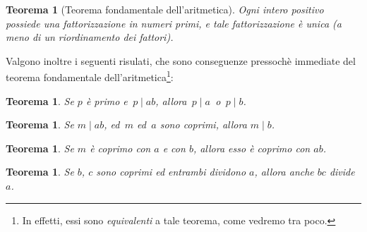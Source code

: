 \documentclass[pdflatex,11pt,a4paper,oneside]{article}
\newcommand{\TFA}{teorema fondamentale dell'aritmetica}
\let\OldEmph\emph
\renewcommand{\emph}[1]{\OldEmph{#1\/}}
\newcommand{\divides}[0]{\mid}
\newtheorem{theorem}[TheoremLike]{Teorema}
\begin{document}
\begin{theorem}[Teorema fondamentale dell'aritmetica]
Ogni intero positivo possiede una fattorizzazione in numeri primi, e
tale fattorizzazione \`e unica (a meno di un riordinamento dei fattori).
\end{theorem}

Valgono inoltre i seguenti risulati, che sono conseguenze pressoch\`e
immediate del \TFA\footnote{In effetti, essi sono \emph{equivalenti}
a tale teorema, come vedremo tra poco.}:

\begin{theorem}\label{thm:TFA-div-p}
Se $p$ \`e primo e \,$p \divides ab$, allora \,$p \divides a$\, o
\,$p \divides b$.
\end{theorem}

\begin{theorem}\label{thm:TFA-div}
Se $m \divides ab$, ed\, $m$ ed\, $a$ sono coprimi, allora $m \divides b$.
\end{theorem}

\begin{theorem}\label{thm:TFA-mul-1}
Se $m$ \`e coprimo con $a$ e con $b$, allora esso \`e coprimo con $ab$.
\end{theorem}

\begin{theorem}\label{thm:TFA-mul-2}
Se $b$, $c$ sono coprimi ed entrambi dividono $a$, allora
anche $bc$ divide $a$.
\end{theorem}
\end{document}
